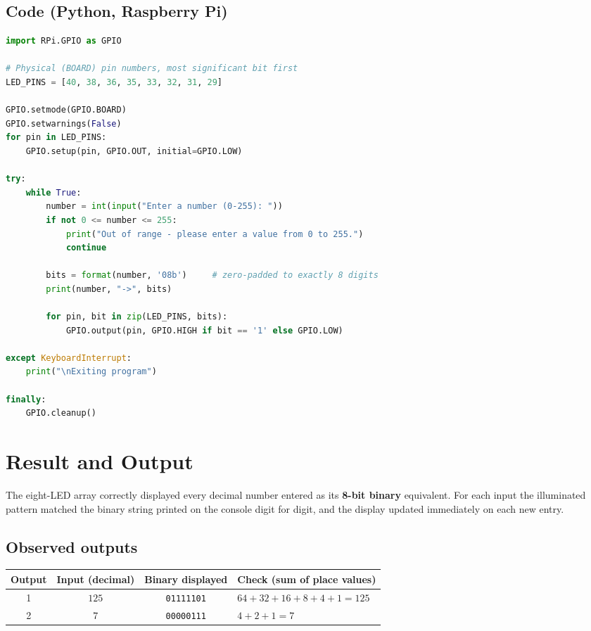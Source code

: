 \documentclass[10pt,a4paper]{article}
\begin{document}
\subsection{Code (Python, Raspberry Pi)}

\begin{lstlisting}[language=Python, caption={Displaying a decimal number on eight LEDs as 8-bit binary.}, label={lst:rpi}]
import RPi.GPIO as GPIO

# Physical (BOARD) pin numbers, most significant bit first
LED_PINS = [40, 38, 36, 35, 33, 32, 31, 29]

GPIO.setmode(GPIO.BOARD)
GPIO.setwarnings(False)
for pin in LED_PINS:
    GPIO.setup(pin, GPIO.OUT, initial=GPIO.LOW)

try:
    while True:
        number = int(input("Enter a number (0-255): "))
        if not 0 <= number <= 255:
            print("Out of range - please enter a value from 0 to 255.")
            continue

        bits = format(number, '08b')     # zero-padded to exactly 8 digits
        print(number, "->", bits)

        for pin, bit in zip(LED_PINS, bits):
            GPIO.output(pin, GPIO.HIGH if bit == '1' else GPIO.LOW)

except KeyboardInterrupt:
    print("\nExiting program")

finally:
    GPIO.cleanup()
\end{lstlisting}

\section{Result and Output}

\begin{keybox}
The eight-LED array correctly displayed every decimal number entered as its
\textbf{8-bit binary} equivalent. For each input the illuminated pattern matched the
binary string printed on the console digit for digit, and the display updated
immediately on each new entry.
\end{keybox}

\subsection*{Observed outputs}

\vspace{2pt}
\noindent
\begin{tabularx}{\textwidth}{@{}c c c X@{}}
\toprule
\rowcolor{soft}
\textbf{Output} & \textbf{Input (decimal)} & \textbf{Binary displayed} & \textbf{Check (sum of place values)} \\
\midrule
1 & $125$ & \texttt{01111101} & $64+32+16+8+4+1 = 125$ \\
2 & $7$   & \texttt{00000111} & $4+2+1 = 7$ \\
\bottomrule
\end{tabularx}
\end{document}
